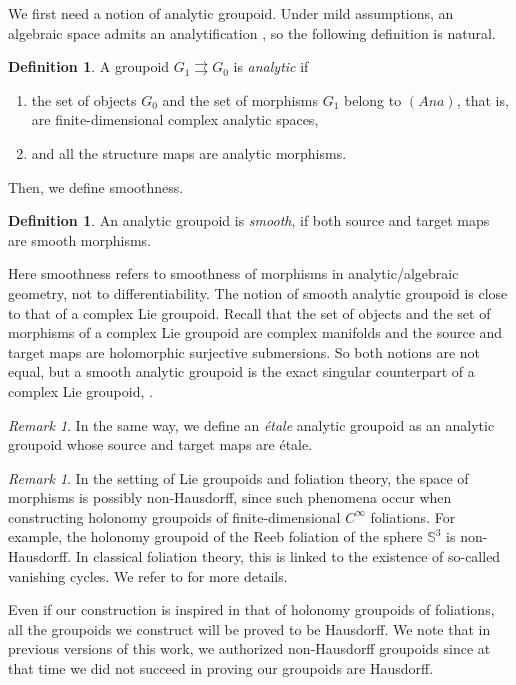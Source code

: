 \documentclass[JEP,XML,SOM,Unicode]{cedram}
\newcommand{\Ana}{\mathit{Ana}}
\theoremstyle{plain}
\theoremstyle{definition}
\newtheorem{definition}[theorem]{Definition}
\theoremstyle{remark}
\newtheorem{remark}[theorem]{Remark}
\numberwithin{equation}{section}
\begin{document}
We first need a notion of analytic groupoid. Under mild assumptions, an algebraic space admits an analytification \cite[Ch.\,I, 5.17ff]{Kn}, so the following definition is natural.
\begin{definition}
\label{defanalyticgroupoid}
A groupoid $G_1\rightrightarrows G_0$ is \emph{analytic} if
\begin{enumerate}
\item
the set of objects $G_0$ and the set of morphisms $G_1$ belong to $(\Ana)$, that is, are finite-dimensional complex analytic spaces,
\item
and all the structure maps are analytic morphisms.
\end{enumerate}
\end{definition}
Then, we define smoothness.
\begin{definition}
An analytic groupoid is \emph{smooth}, if both source and target maps are smooth morphisms.
\end{definition}
Here smoothness refers to smoothness of morphisms in analytic/algebraic geometry, not to differentiability. The notion of smooth analytic groupoid is close to that of a complex Lie groupoid. Recall that the set of objects and the set of morphisms of a complex Lie groupoid are complex manifolds and the source and target maps are holomorphic surjective submersions. So both notions are not equal, but a smooth analytic groupoid is the exact singular counterpart of a complex Lie groupoid, \cf \hbox{\cite[\S 5]{Moerdijk}}.

\begin{remark}
\label{etale}
In the same way, we define an \emph{étale} analytic groupoid as an analytic groupoid whose source and target maps are étale.
\end{remark}

\begin{remark}
\label{nonHausdorff}
In the setting of Lie groupoids and foliation theory, the space of morphisms is possibly non-Hausdorff, since such phenomena occur when constructing holonomy groupoids of finite-dimensional $C^\infty$ foliations. For example, the holonomy groupoid of the Reeb foliation of the sphere $\mathbb S^3$ is non-Hausdorff. In classical foliation theory, this is linked to the existence of so-called vanishing cycles. We refer to \cite[\S 5.2]{Moerdijk} for more details.

Even if our construction is inspired in that of holonomy groupoids of foliations, all the groupoids we construct will be proved to be Hausdorff. We note that in previous versions of this work, we authorized non-Hausdorff groupoids since at that time we did not succeed in proving our groupoids are Hausdorff.
\end{remark}
\end{document}
